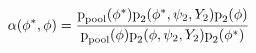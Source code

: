 \begin{equation*}
  \alpha (\phi^{*}, \phi) = 
  \frac {
    \text{p}_{\text{pool}} (\phi^{*})
    \text{p}_{2}(\phi^{*}, \psi_{2}, Y_{2})
    \text{p}_{2}(\phi)
  } {
    \text{p}_{\text{pool}} (\phi)
    \text{p}_{2}(\phi, \psi_{2}, Y_{2})
    \text{p}_{2}(\phi^{*})
  }
\end{equation*}